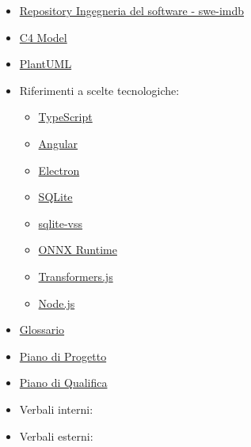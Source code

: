 \begin{itemize}
          {Repository Architettura esagonale (Java) }
    \item \href{https://github.com/rcardin/swe-imdb}
          {Repository Ingegneria del software - swe-imdb }
    \item \href{https://c4model.com/}
          {C4 Model }
    \item \href{https://plantuml.com/}
          {PlantUML }
    \item Riferimenti a scelte tecnologiche:
          \begin{itemize}
              \item \href{https://www.typescriptlang.org/}
                    {TypeScript }
              \item \href{https://angular.io/}
                    {Angular }
              \item \href{https://www.electronjs.org/}
                    {Electron }
              \item \href{https://www.sqlite.org/}
                    {SQLite }
              \item \href{https://github.com/asg017/sqlite-vss}
                    {sqlite-vss }
              \item \href{https://onnxruntime.ai/}
                    {ONNX Runtime }
              \item \href{https://huggingface.co/docs/transformers.js}
                    {Transformers.js }
              \item \href{https://nodejs.org/}
                    {Node.js }
          \end{itemize}
    \item \href{https://7-zpus.github.io/Docs/assets/3_PB/DocumentiInterni/Glossario.pdf}{Glossario }
    \item \href{https://github.com/7-ZPUs/Docs/blob/main/3_PB/DocumentiEsterni/PianoDiProgetto.pdf}{Piano di Progetto }
    \item \href{https://github.com/7-ZPUs/Docs/blob/main/3_PB/DocumentiEsterni/PianoDiQualifica.pdf}{Piano di Qualifica }
    \item Verbali interni:
    \item Verbali esterni:
\end{itemize}

